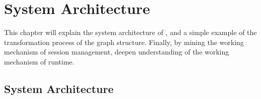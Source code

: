 \begin{savequote}[45mm]
\end{savequote}

\chapter{System Architecture} 
\label{ch:architecture}

\begin{content}

This chapter will explain the system architecture of \tf{}, and a simple example of the transformation process of the graph structure. Finally, by mining the working mechanism of session management, deepen understanding of the working mechanism of \tf{} runtime.

\end{content}

\section{System Architecture}
	
